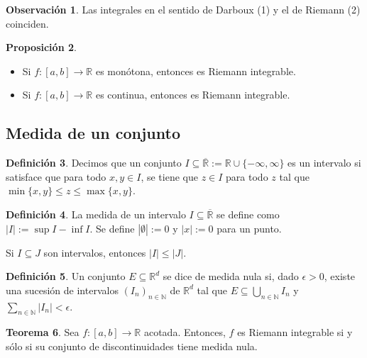 \documentclass[11pt]{article}
\theoremstyle{definition} %
\newtheorem{theorem}{Teorema}[section]
\newtheorem{proposition}[theorem]{Proposición}
\newtheorem{definition}[theorem]{Definición}
\newtheorem{remark}[theorem]{Observación}
\begin{document}
\begin{remark}
Las integrales en el sentido de Darboux (1) y el de Riemann (2) coinciden.
\end{remark}

\begin{proposition}
\begin{itemize}
    \item Si $f:[a,b] \rightarrow \mathbb{R}$ es monótona, entonces es Riemann integrable.
    \item Si $f:[a,b] \rightarrow \mathbb{R}$ es continua, entonces es Riemann integrable.
\end{itemize}
\end{proposition}

\subsection{Medida de un conjunto}
\label{sec:measure}

\begin{definition}
Decimos que un conjunto $I \subseteq \overline{\mathbb{R}} := \mathbb{R} \cup \{-\infty, \infty\}$ es un intervalo si satisface que para todo $x,y \in I$, se tiene que $z \in I$ para todo $z$ tal que $\min\{x,y\} \le z \le \max\{x,y\}$.
\end{definition}

\begin{definition}
La medida de un intervalo $I \subseteq \overline{\mathbb{R}}$ se define como $|I| := \sup I - \inf I$. Se define $|\emptyset|:=0$ y $|x|:=0$ para un punto.
\end{definition}

\begin{property}
Si $I \subseteq J$ son intervalos, entonces $|I| \le |J|$.
\end{property}

\begin{definition}
Un conjunto $E \subseteq \mathbb{R}^d$ se dice de medida nula si, dado $\epsilon > 0$, existe una sucesión de intervalos $(I_n)_{n \in \mathbb{N}}$ de $\mathbb{R}^d$ tal que $E \subseteq \bigcup_{n \in \mathbb{N}} I_n$ y $\sum_{n \in \mathbb{N}} |I_n| < \epsilon$.
\end{definition}

\begin{theorem}
Sea $f:[a,b] \rightarrow \mathbb{R}$ acotada. Entonces, $f$ es Riemann integrable si y sólo si su conjunto de discontinuidades tiene medida nula.
\end{theorem}
\end{document}
